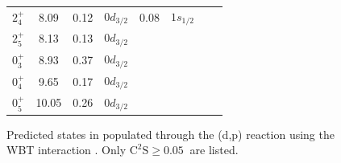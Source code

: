\documentclass[a4paper, 10pt]{article}
\newcommand{\iso}[2]{\ce{^{#1}#2}}
\newcommand{\ctwos}{\ensuremath{\text{C}^2\text{S}}\xspace}
\begin{document}
\begin{figure}[!htb]
\begin{minipage}[c]{0.38\linewidth}
\begin{adjustbox}{max width=\linewidth}
\begin{tabular}{@{}c c S c S c S c@{}}
                $2^+_{4}$ & 8.09          & 0.12                    & $0d_{3/2}$ & 0.08     & $1s_{1/2}$ &          &            \\
                $2^+_{5}$ & 8.13          & 0.13                    & $0d_{3/2}$ &          &            &          &            \\
                $0^+_{3}$ & 8.93          & 0.37                    & $0d_{3/2}$ &          &            &          &            \\
                $0^+_{4}$ & 9.65          & 0.17                    & $0d_{3/2}$ &          &            &          &            \\
                $0^+_{5}$ & 10.05         & 0.26                    & $0d_{3/2}$ &          &            &          &            \\
                \bottomrule
            \end{tabular}
        \end{adjustbox}
        \caption{Predicted states in \iso{18}{C} populated through the \iso{17}{C}(d,p) reaction using the WBT interaction \cite{warburton1992}. Only $\ctwos \geq \qty{0.05}{}$ are listed.}
        \label{tab:sm}
    \end{minipage}
\end{figure}
\end{document}
